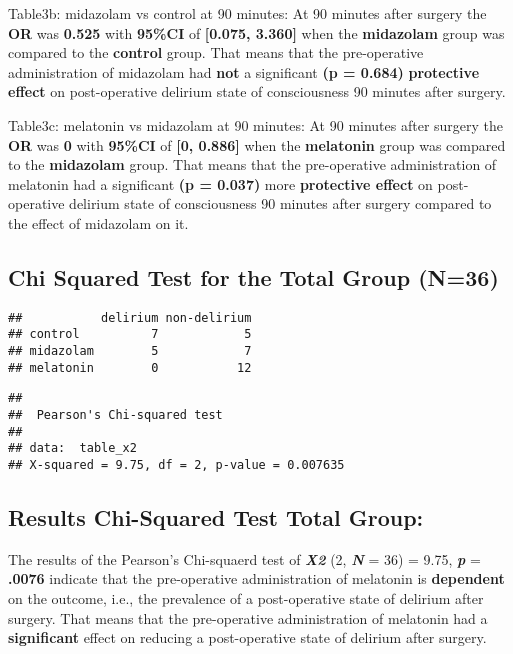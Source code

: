 \documentclass[
]{article}
\begin{document}
Table3b: midazolam vs control at 90 minutes: At 90 minutes after surgery
the \textbf{OR} was \textbf{0.525} with \textbf{95\%CI} of
\textbf{{[}0.075, 3.360{]}} when the \textbf{midazolam} group was
compared to the \textbf{control} group. That means that the
pre-operative administration of midazolam had \textbf{not} a significant
\textbf{(p = 0.684)} \textbf{protective effect} on post-operative
delirium state of consciousness 90 minutes after surgery.

Table3c: melatonin vs midazolam at 90 minutes: At 90 minutes after
surgery the \textbf{OR} was \textbf{0} with \textbf{95\%CI} of
\textbf{{[}0, 0.886{]}} when the \textbf{melatonin} group was compared
to the \textbf{midazolam} group. That means that the pre-operative
administration of melatonin had a significant \textbf{(p = 0.037)} more
\textbf{protective effect} on post-operative delirium state of
consciousness 90 minutes after surgery compared to the effect of
midazolam on it.

\hypertarget{chi-squared-test-for-the-total-group-n36}{%
\subsection{Chi Squared Test for the Total Group
(N=36)}\label{chi-squared-test-for-the-total-group-n36}}

\begin{verbatim}
##           delirium non-delirium
## control          7            5
## midazolam        5            7
## melatonin        0           12
\end{verbatim}

\begin{verbatim}
## 
##  Pearson's Chi-squared test
## 
## data:  table_x2
## X-squared = 9.75, df = 2, p-value = 0.007635
\end{verbatim}

\hypertarget{results-chi-squared-test-total-group}{%
\subsection{Results Chi-Squared Test Total
Group:}\label{results-chi-squared-test-total-group}}

The results of the Pearson's Chi-squaerd test of \textbf{\emph{X2}} (2,
\textbf{\emph{N}} = 36) = 9.75, \textbf{\emph{p}} = \textbf{.0076}
indicate that the pre-operative administration of melatonin is
\textbf{dependent} on the outcome, i.e., the prevalence of a
post-operative state of delirium after surgery. That means that the
pre-operative administration of melatonin had a \textbf{significant}
effect on reducing a post-operative state of delirium after surgery.
\end{document}
